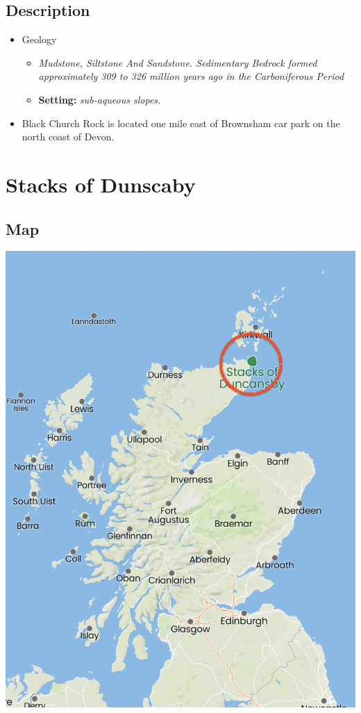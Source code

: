 \documentclass[11pt]{article}
\begin{document}
\subsection{Description}
\label{sec:org54ca3aa}

\begin{itemize}
\item Geology 

\begin{itemize}
\item \emph{Mudstone, Siltstone And Sandstone. Sedimentary Bedrock formed approximately 309 to 326 million years ago in the Carboniferous Period}

\item \textbf{Setting:} \emph{sub-aqueous slopes.}
\end{itemize}

\item Black Church Rock is located one mile east of Brownsham car park on the north coast of Devon.
\end{itemize}

\section{Stacks of Dunscaby}
\label{sec:orga3eadb7}

\subsection{Map}
\label{sec:org049f76e}
\begin{center}
\includegraphics[width=.9\linewidth]{Images/stacks-of-dunscaby.png}
\end{center}
\end{document}
